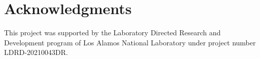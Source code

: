 \documentclass[letterpaper]{article} %
\begin{document}


\section{Acknowledgments}
This project was supported by the Laboratory Directed Research and Development program of Los Alamos National Laboratory under project number LDRD-20210043DR.



\end{document}
